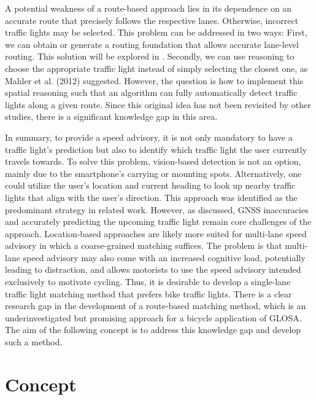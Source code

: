 A potential weakness of a route-based approach lies in its dependence on an accurate route that precisely follows the respective lanes. Otherwise, incorrect traffic lights may be selected. This problem can be addressed in two ways: First, we can obtain or generate a routing foundation that allows accurate lane-level routing. This solution will be explored in  . Secondly, we can use reasoning to choose the appropriate traffic light instead of simply selecting the closest one, as Mahler et al. (2012) \cite{mahler_reducing_2012} suggested. However, the question is how to implement this spatial reasoning such that an algorithm can fully automatically detect traffic lights along a given route. Since this original idea has not been revisited by other studies, there is a significant knowledge gap in this area.

\begin{Summary}
In summary, to provide a speed advisory, it is not only mandatory to have a traffic light's prediction but also to identify which traffic light the user currently travels towards. To solve this problem, vision-based detection is not an option, mainly due to the smartphone's carrying or mounting spots. Alternatively, one could utilize the user's location and current heading to look up nearby traffic lights that align with the user's direction. This approach was identified as the predominant strategy in related work. However, as discussed, GNSS inaccuracies and accurately predicting the upcoming traffic light remain core challenges of the approach. Location-based approaches are likely more suited for multi-lane speed advisory in which a coarse-grained matching suffices. The problem is that multi-lane speed advisory may also come with an increased cognitive load, potentially leading to distraction, and allows motorists to use the speed advisory intended exclusively to motivate cycling. Thus, it is desirable to develop a single-lane traffic light matching method that prefers bike traffic lights. There is a clear research gap in the development of a route-based matching method, which is an underinvestigated but promising approach for a bicycle application of GLOSA. The aim of the following concept is to address this knowledge gap and develop such a method.
\end{Summary}

\section{Concept}

